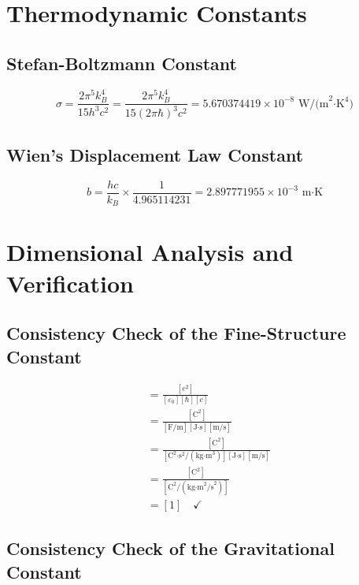 \documentclass[12pt,a4paper]{article}
\theoremstyle{definition}
\begin{document}
	\section{Thermodynamic Constants}
	
	\subsection{Stefan-Boltzmann Constant}
	
	\begin{equation}
		\sigma = \frac{2\pi^5 k_B^4}{15 h^3 c^2} = \frac{2\pi^5 k_B^4}{15 (2\pi\hbar)^3 c^2} = 5.670374419 \times 10^{-8} \text{ W/(m}^2\text{·K}^4\text{)}
	\end{equation}
	
	\subsection{Wien's Displacement Law Constant}
	
	\begin{equation}
		b = \frac{hc}{k_B} \times \frac{1}{4.965114231} = 2.897771955 \times 10^{-3} \text{ m·K}
	\end{equation}
	
	\section{Dimensional Analysis and Verification}
	
	\subsection{Consistency Check of the Fine-Structure Constant}
	
	\begin{align}
		[\alpha] &= \frac{[e^2]}{[\varepsilon_0][\hbar][c]}\\
		&= \frac{[\text{C}^2]}{[\text{F/m}][\text{J·s}][\text{m/s}]}\\
		&= \frac{[\text{C}^2]}{[\text{C}^2\text{·s}^2/(\text{kg·m}^3)][\text{J·s}][\text{m/s}]}\\
		&= \frac{[\text{C}^2]}{[\text{C}^2/(\text{kg·m}^2\text{/s}^2)]}\\
		&= [1] \quad \checkmark
	\end{align}
	
	\subsection{Consistency Check of the Gravitational Constant}
	
\end{document}

